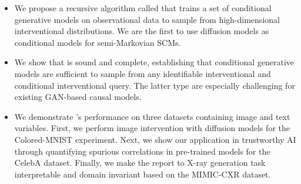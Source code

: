 \documentclass{article}
\newcommand{\red}{\textcolor{red}}
\newcommand{\idgen}{\text{ID-GEN}\xspace}
\theoremstyle{plain}
\theoremstyle{definition}
\theoremstyle{remark}
\begin{document}
	\begin{itemize}
		\item We propose a recursive algorithm called \idgen that trains a set of conditional generative models on observational data to sample from  high-dimensional interventional distributions.
  We are the first to use diffusion models as conditional models for semi-Markovian SCMs.
  
  \item 
  We show that \idgen is sound and complete, establishing that conditional generative models are sufficient to sample from any identifiable interventional and conditional interventional query. The latter type are especially challenging for existing GAN-based  causal models.
%
%
\item  
We demonstrate \idgen's performance on three datasets containing image and text variables. First, we perform image intervention with diffusion models for the Colored-MNIST experiment.
Next, we show our application in trustworthy AI through quantifying spurious correlations in pre-trained models for the CelebA dataset. Finally, we make the report to X-ray generation task interpretable and domain invariant based on the MIMIC-CXR dataset.
\end{itemize}
%
%
\end{document}
